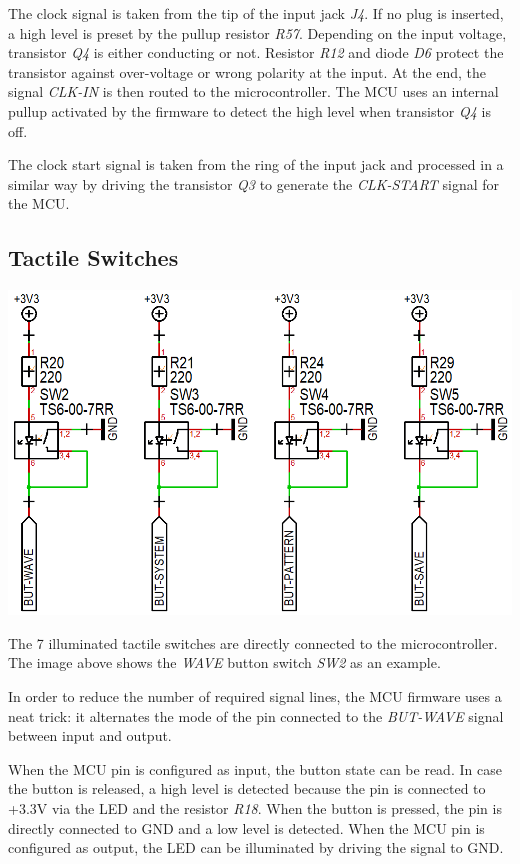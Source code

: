 \documentclass{scrartcl}
\begin{document}
The clock signal is taken from the tip of the input jack \emph{J4}. If no plug is inserted, a high level is preset by the pullup resistor \emph{R57}. Depending on the input voltage, transistor \emph{Q4} is either conducting or not. Resistor \emph{R12} and diode \emph{D6} protect the transistor against over-voltage or wrong polarity at the input. At the end, the signal \emph{CLK-IN} is then routed to the microcontroller. The MCU uses an internal pullup activated by the firmware to detect the high level when transistor \emph{Q4} is off.

The clock start signal is taken from the ring of the input jack and processed in a similar way by driving the transistor \emph{Q3} to generate the \emph{CLK-START} signal for the MCU.

\subsection{Tactile Switches}

\begin{center}
    \includegraphics[scale=0.35]{assets/schema-switch.png}
\end{center}

The 7 illuminated tactile switches are directly connected to the microcontroller. The image above shows the \emph{WAVE} button switch \emph{SW2} as an example.

In order to reduce the number of required signal lines, the MCU firmware uses a neat trick: it alternates the mode of the pin connected to the \emph{BUT-WAVE} signal between input and output.

When the MCU pin is configured as input, the button state can be read. In case the button is released, a high level is detected because the pin is connected to +3.3V via the LED and the resistor \emph{R18}. When the button is pressed, the pin is directly connected to GND and a low level is detected. When the MCU pin is configured as output, the LED can be illuminated by driving the signal to GND.
\end{document}
